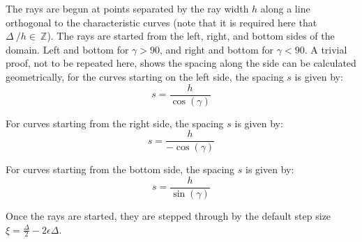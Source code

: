 \documentclass{article}
\begin{document}
The rays are begun at points separated by the ray width $h$ along a line orthogonal to the characteristic curves (note that it is required here that $\Delta~ /h \in~ \mathbb{Z}$). The rays are started from the left, right, and bottom sides of the domain. Left and bottom for $\gamma>90$, and right and bottom for $\gamma<90$. A trivial proof, not to be repeated here, shows the spacing along the side can be calculated geometrically, for the curves starting on the left side, the spacing $s$ is given by:
\begin{equation}
s=\frac{h}{\cos({\gamma})}
\label{eq:leftpsacing}
\end{equation}

For curves starting from the right side, the spacing $s$ is given by:
\begin{equation}
s=\frac{h}{-\cos({\gamma})}
\label{eq:rightspacing}
\end{equation}

For curves starting from the bottom side, the spacing $s$ is given by:
\begin{equation}
s=\frac{h}{\sin({\gamma})}
\label{eq:botspacing}
\end{equation}

Once the rays are started, they are stepped through by the default step size $\xi=\frac{\Delta}{2}-2\epsilon \Delta$. 
\end{document}
